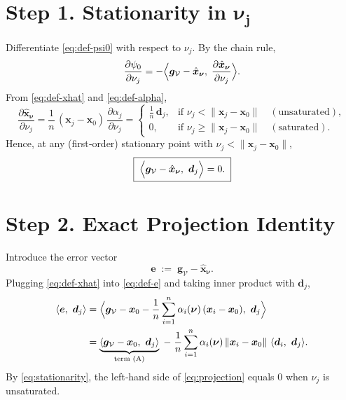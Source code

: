 \documentclass{article}
\theoremstyle{plain}
\theoremstyle{definition}
\theoremstyle{remark}
\begin{document}
\bigskip

\section*{Step 1. Stationarity in $\bm{\nu_j}$}

Differentiate \eqref{eq:def-psi0} with respect to $\nu_j$.
By the chain rule,
\begin{equation}
\frac{\partial \psi_0}{\partial \nu_j}
= - \Bigl\langle \bm{g}_{\mathcal{V}}-\hat {\bm{x}}_{\bm{\nu}},\; \frac{\partial \hat {\bm{x}}_{\bm{\nu}}}{\partial \nu_j}\Bigr\rangle .
\label{eq:chain}
\end{equation}
From \eqref{eq:def-xhat} and \eqref{eq:def-alpha},
\[
\frac{\partial \hat {\bm{x}}_{\bm{\nu}}}{\partial \nu_j}
= \frac{1}{n}\,(\bm{x}_j-\bm{x}_0)\,\frac{\partial \alpha_j}{\partial \nu_j}
= \begin{cases}
\frac{1}{n}\,\bm{d}_j, & \text{if } \nu_j<\|\bm{x}_j-\bm{x}_0\| \quad(\text{unsaturated}),\\
0, & \text{if } \nu_j\ge \|\bm{x}_j-\bm{x}_0\|\quad(\text{saturated}).
\end{cases}
\]
Hence, at any (first‑order) stationary point with $\nu_j<\|\bm{x}_j-\bm{x}_0\|$,
\begin{equation}
\boxed{\;
\Bigl\langle \bm{g}_{\mathcal{V}}-\hat {\bm{x}}_{\bm{\nu}},\ \bm{d}_j\Bigr\rangle = 0.
\;}
\label{eq:stationarity}
\end{equation}

\bigskip

\section*{Step 2. Exact Projection Identity}

Introduce the error vector
\begin{equation}
\bm{e} \;:=\; \bm{g}_{\mathcal{V}} - \hat {\bm{x}}_{\bm{\nu}} .
\label{eq:def-e}
\end{equation}
Plugging \eqref{eq:def-xhat} into \eqref{eq:def-e} and taking inner product with $\bm{d}_j$,
\begin{align}
\langle \bm{e},\ \bm{d}_j\rangle
&= \Bigl\langle \bm{g}_{\mathcal{V}} - \bm{x}_0 - \frac{1}{n}\sum_{i=1}^n \alpha_i(\bm{\nu})\,(\bm{x}_i-\bm{x}_0),\ \bm{d}_j\Bigr\rangle
\nonumber\\
&= \underbrace{\langle \bm{g}_{\mathcal{V}} - \bm{x}_0,\ \bm{d}_j\rangle}_{\text{term (A)}}
\;-\; \frac{1}{n}\sum_{i=1}^n \alpha_i(\bm{\nu})\,\|\bm{x}_i-\bm{x}_0\|\ \langle \bm{d}_i,\ \bm{d}_j\rangle .
\label{eq:projection}
\end{align}
By \eqref{eq:stationarity}, the left‑hand side of \eqref{eq:projection} equals $0$ when $\nu_j$ is unsaturated.
\end{document}

